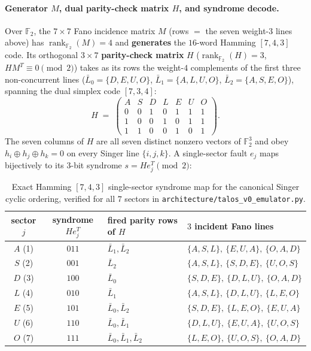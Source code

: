 \paragraph{Generator $M$, dual parity-check matrix $H$, and syndrome decode.}
Over $\mathbb{F}_2$, the $7\times 7$ Fano incidence matrix $M$ (rows $=$ the
seven weight-$3$ lines above) has $\operatorname{rank}_{\mathbb{F}_2}(M)=4$ and
\textbf{generates} the $16$-word Hamming $[7,4,3]$ code. Its orthogonal
$3\times 7$ \textbf{parity-check matrix} $H$ ($\operatorname{rank}_{\mathbb{F}_2}(H)=3$,
$HM^T\equiv 0\pmod 2$) takes as its rows the weight-$4$ complements of the
first three non-concurrent lines ($\bar{L}_0=\{D,E,U,O\}$,
$\bar{L}_1=\{A,L,U,O\}$, $\bar{L}_2=\{A,S,E,O\}$), spanning the dual simplex
code $[7,3,4]$:
\[
H \;=\;
\left(\begin{array}{ccccccc}
A & S & D & L & E & U & O \\ \hline
0 & 0 & 1 & 0 & 1 & 1 & 1 \\
1 & 0 & 0 & 1 & 0 & 1 & 1 \\
1 & 1 & 0 & 0 & 1 & 0 & 1
\end{array}\right).
\]
The seven columns of $H$ are all seven distinct nonzero vectors of
$\mathbb{F}_2^3$ and obey $h_i\oplus h_j\oplus h_k = 0$ on every Singer line
$\{i,j,k\}$. A single-sector fault $e_j$ maps bijectively to its $3$-bit
syndrome $s = He_j^T\pmod 2$:

\begin{table}[H]
\centering\small
\begin{tabular}{@{}ccll@{}}
\toprule
sector $j$ & syndrome $He_j^T$ & fired parity rows of $H$ & $3$ incident Fano lines \\
\midrule
$A$ (1) & $011$ & $\bar{L}_1,\bar{L}_2$ & $\{A,S,L\},\ \{E,U,A\},\ \{O,A,D\}$ \\
$S$ (2) & $001$ & $\bar{L}_2$ & $\{A,S,L\},\ \{S,D,E\},\ \{U,O,S\}$ \\
$D$ (3) & $100$ & $\bar{L}_0$ & $\{S,D,E\},\ \{D,L,U\},\ \{O,A,D\}$ \\
$L$ (4) & $010$ & $\bar{L}_1$ & $\{A,S,L\},\ \{D,L,U\},\ \{L,E,O\}$ \\
$E$ (5) & $101$ & $\bar{L}_0,\bar{L}_2$ & $\{S,D,E\},\ \{L,E,O\},\ \{E,U,A\}$ \\
$U$ (6) & $110$ & $\bar{L}_0,\bar{L}_1$ & $\{D,L,U\},\ \{E,U,A\},\ \{U,O,S\}$ \\
$O$ (7) & $111$ & $\bar{L}_0,\bar{L}_1,\bar{L}_2$ & $\{L,E,O\},\ \{U,O,S\},\ \{O,A,D\}$ \\
\bottomrule
\end{tabular}
\caption{Exact Hamming $[7,4,3]$ single-sector syndrome map for the canonical
Singer cyclic ordering, verified for all $7$ sectors in
\texttt{architecture/talos\_v0\_emulator.py}.}
\end{table}

